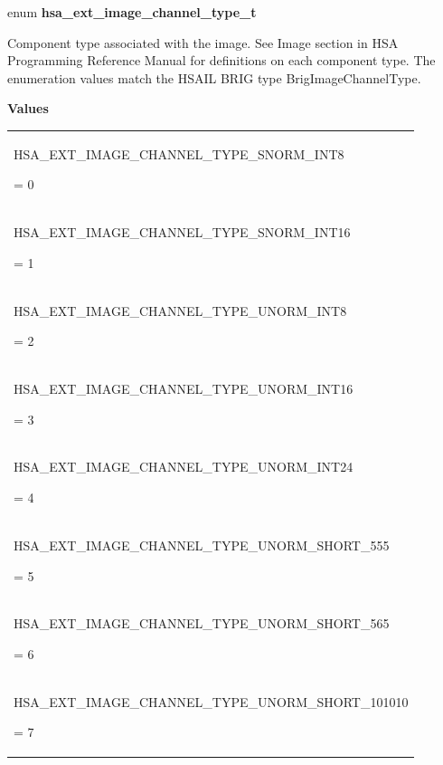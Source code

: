 \documentclass[final]{book}
\newcommand{\reftyp}[1]{#1}
\newcommand{\refenu}[1]{\reftyp{#1}}
\begin{document}
\noindent\begin{tcolorbox}[breakable,nobeforeafter,arc=0mm,colframe=white,colback=lightgray,left=0mm]
enum \hypertarget{group__images_1gaa143aa6feeaf24103b886c571ace568f}{\textbf{hsa_ext_image_channel_type_t}}
\end{tcolorbox}
Component type associated with the image. See Image section in HSA Programming Reference Manual for definitions on each component type. The enumeration values match the HSAIL BRIG type BrigImageChannelType.

\noindent\textbf{Values}\\[-5mm]
\begin{longtable}{@{\hspace{2em}}p{\linewidth-2em}}
\hspace{-2em}\hypertarget{group__images_1ggaa143aa6feeaf24103b886c571ace568fa59d72c5a5199e360e7a5773987696e42}{\refenu{HSA_EXT_IMAGE_CHANNEL_TYPE_SNORM_INT8}} = 0\\[2mm]
\hspace{-2em}\hypertarget{group__images_1ggaa143aa6feeaf24103b886c571ace568fa55ee5e3b2e6f3b593a9cf99f1f195b91}{\refenu{HSA_EXT_IMAGE_CHANNEL_TYPE_SNORM_INT16}} = 1\\[2mm]
\hspace{-2em}\hypertarget{group__images_1ggaa143aa6feeaf24103b886c571ace568fae3100c7304a6e1805711cd6965919e53}{\refenu{HSA_EXT_IMAGE_CHANNEL_TYPE_UNORM_INT8}} = 2\\[2mm]
\hspace{-2em}\hypertarget{group__images_1ggaa143aa6feeaf24103b886c571ace568fa9a27c2852fb86761dcbabfda391a8e73}{\refenu{HSA_EXT_IMAGE_CHANNEL_TYPE_UNORM_INT16}} = 3\\[2mm]
\hspace{-2em}\hypertarget{group__images_1ggaa143aa6feeaf24103b886c571ace568fa0b12c9e8bee88608297ecd9246ebf96a}{\refenu{HSA_EXT_IMAGE_CHANNEL_TYPE_UNORM_INT24}} = 4\\[2mm]
\hspace{-2em}\hypertarget{group__images_1ggaa143aa6feeaf24103b886c571ace568fa40e1eb056776d35da9f1dbaf2e264a19}{\refenu{HSA_EXT_IMAGE_CHANNEL_TYPE_UNORM_SHORT_555}} = 5\\[2mm]
\hspace{-2em}\hypertarget{group__images_1ggaa143aa6feeaf24103b886c571ace568fa6165cebe82d6c2b115bbce04548f5626}{\refenu{HSA_EXT_IMAGE_CHANNEL_TYPE_UNORM_SHORT_565}} = 6\\[2mm]
\hspace{-2em}\hypertarget{group__images_1ggaa143aa6feeaf24103b886c571ace568fad5193853cc5321dd50b16eb9e920237f}{\refenu{HSA_EXT_IMAGE_CHANNEL_TYPE_UNORM_SHORT_101010}} = 7\\[2mm]

\end{longtable}
\end{document}
